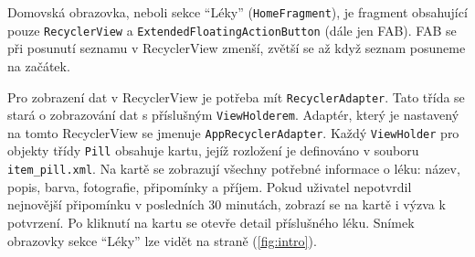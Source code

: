 \documentclass[../TakeYourPill.tex]{subfiles}
\begin{document}
Domovská obrazovka, neboli sekce \enquote{Léky} (\texttt{HomeFragment}), je fragment obsahující pouze \texttt{RecyclerView} a \texttt{ExtendedFloatingActionButton} (dále jen FAB). FAB se při posunutí seznamu v RecyclerView zmenší, zvětší se až když seznam posuneme na začátek. 

Pro zobrazení dat v RecyclerView je potřeba mít \texttt{RecyclerAdapter}. Tato třída se stará o zobrazování dat s příslušným \texttt{ViewHolderem}. Adaptér, který je nastavený na tomto RecyclerView se jmenuje \texttt{AppRecyclerAdapter}. Každý \texttt{ViewHolder} pro objekty třídy \texttt{Pill} obsahuje kartu, jejíž rozložení je definováno v souboru \texttt{item\_pill.xml}. Na kartě se zobrazují všechny potřebné informace o léku: název, popis, barva, fotografie, připomínky a příjem. Pokud uživatel nepotvrdil nejnovější připomínku v posledních 30 minutách, zobrazí se na kartě i výzva k potvrzení. Po kliknutí na kartu se otevře detail příslušného léku. Snímek obrazovky sekce \enquote{Léky} lze vidět na straně \pageref{fig:intro} (\ref{fig:intro}).



\end{document}
